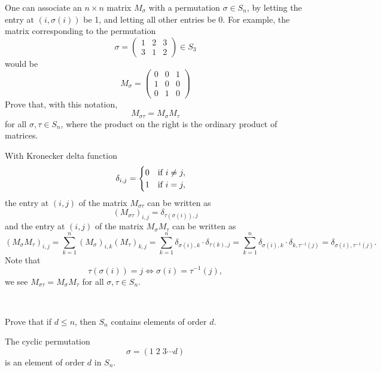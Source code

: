 \documentclass[12pt,letterpaper,boxed]{hmcpset}
\begin{document}
		


\begin{problem}[2.1]
	One can associate an $n\times n$ matrix $M_\sigma$ with a permutation $\sigma \in S_n$, by
	letting the entry at $(i, \sigma(i))$ be 1, and letting all other entries be 0. For example,
	the matrix corresponding to the permutation
	\[
	\sigma=\left(
	\begin{matrix}	
	1 & 2 & 3\\	
    3 & 1 & 2	
	\end{matrix}
	\right)\in S_3
	\]
	would be 
	\[
	M_\sigma=\left(
	\begin{matrix}	
	0 & 0 & 1\\	
	1 & 0 & 0\\	
	0 & 1 & 0
	\end{matrix}
	\right)
	\]
	Prove that, with this notation,
	\[
	M_{\sigma\tau}=M_{\sigma}M_{\tau}
	\]
	for all $\sigma,\tau\in S_n$, where the product on the right is the ordinary product of matrices.
\end{problem}
\begin{solution}
	With Kronecker delta function	
    \[
    \delta _{{i,j}}=
    	\begin{cases}
    	0{\text{\quad if }}i\neq j,\\
    	1{\text{\quad if }}i=j,
    	\end{cases}
    \]
	the entry at $(i,j)$ of the matrix $M_{\sigma\tau}$ can be written as
	\[
	(M_{\sigma\tau})_{i,j}=\delta_{\tau(\sigma(i)),j}
	\]
	and the entry at $(i,j)$ of the matrix $M_{\sigma}M_{\tau}$ can be written as
	\[
	(M_{\sigma}M_{\tau})_{i,j}=\sum_{k=1}^{n}(M_{\sigma})_{i,k}(M_{\tau})_{k,j}=\sum_{k=1}^{n}\delta_{\sigma(i),k}\cdot\delta_{\tau(k),j}=\sum_{k=1}^{n}\delta_{\sigma(i),k}\cdot\delta_{k,\tau^{-1}(j)}=\delta_{\sigma(i),\tau^{-1}(j)}.
	\]
	Note that
	\[
	\tau(\sigma(i))=j\iff \sigma(i)=\tau^{-1}(j),
	\]
    we see $M_{\sigma\tau}=M_{\sigma}M_{\tau}$
    for all $\sigma,\tau\in S_n$.
    
   
\end{solution}
~\\

\begin{problem}[2.2]
	Prove that if $d \le n$, then $S_n$ contains elements of order $d$.
\end{problem}
\begin{solution}
	The cyclic permutation 
	\[
	\sigma=(1\;2\;3\cdots d)
	\]
    is an element of order $d$ in $S_n$.
\end{solution}
\end{document}
